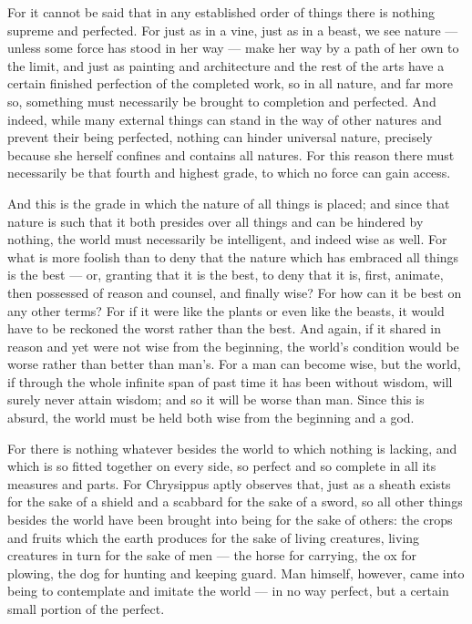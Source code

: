  For it cannot be said that in any established order of things there is nothing supreme and perfected. For just as in a vine, just as in a beast, we see nature — unless some force has stood in her way — make her way by a path of her own to the limit, and just as painting and architecture and the rest of the arts have a certain finished perfection of the completed work, so in all nature, and far more so, something must necessarily be brought to completion and perfected. And indeed, while many external things can stand in the way of other natures and prevent their being perfected, nothing can hinder universal nature, precisely because she herself confines and contains all natures. For this reason there must necessarily be that fourth and highest grade, to which no force can gain access.

 And this is the grade in which the nature of all things is placed; and since that nature is such that it both presides over all things and can be hindered by nothing, the world must necessarily be intelligent, and indeed wise as well. For what is more foolish than to deny that the nature which has embraced all things is the best — or, granting that it is the best, to deny that it is, first, animate, then possessed of reason and counsel, and finally wise? For how can it be best on any other terms? For if it were like the plants or even like the beasts, it would have to be reckoned the worst rather than the best. And again, if it shared in reason and yet were not wise from the beginning, the world's condition would be worse rather than better than man's. For a man can become wise, but the world, if through the whole infinite span of past time it has been without wisdom, will surely never attain wisdom; and so it will be worse than man. Since this is absurd, the world must be held both wise from the beginning and a god.

 For there is nothing whatever besides the world to which nothing is lacking, and which is so fitted together on every side, so perfect and so complete in all its measures and parts. For Chrysippus aptly observes that, just as a sheath exists for the sake of a shield and a scabbard for the sake of a sword, so all other things besides the world have been brought into being for the sake of others: the crops and fruits which the earth produces for the sake of living creatures, living creatures in turn for the sake of men — the horse for carrying, the ox for plowing, the dog for hunting and keeping guard. Man himself, however, came into being to contemplate and imitate the world — in no way perfect, but a certain small portion of the perfect.

